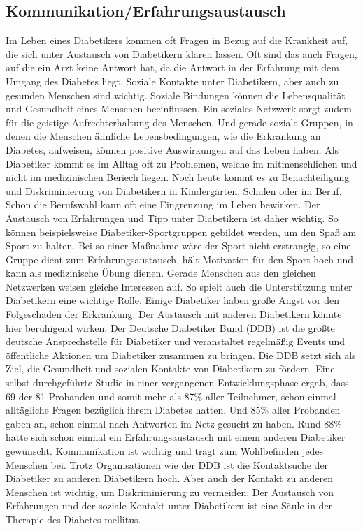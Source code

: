 \documentclass[a4paper,11pt]{article}%
\renewcommand{\\}{\vspace*{0.5\baselineskip} \newline}
\begin{document}
\subsection{Kommunikation/Erfahrungsaustausch}
	Im Leben eines Diabetikers kommen oft Fragen in Bezug auf die Krankheit auf, die sich unter Austausch von Diabetikern klären lassen. Oft sind das auch Fragen, auf die ein Arzt keine Antwort hat, da die Antwort in der Erfahrung mit dem Umgang des Diabetes liegt.\cite{JR}\\
	Soziale Kontakte unter Diabetikern, aber auch zu gesunden Menschen sind wichtig. Soziale Bindungen können die Lebensqualität und Gesundheit eines Menschen beeinflussen. Ein soziales Netzwerk sorgt zudem für die geistige Aufrechterhaltung des Menschen. Und gerade soziale Gruppen, in denen die Menschen ähnliche Lebensbedingungen, wie die Erkrankung an Diabetes, aufweisen, können positive Auswirkungen auf das Leben haben. \newline
	Als Diabetiker kommt es im Alltag oft zu Problemen, welche im mitmenschlichen und nicht im medizinischen Beriech liegen. Noch heute kommt es zu Benachteiligung und Diskriminierung von Diabetikern in Kindergärten, Schulen oder im Beruf. Schon die Berufswahl kann oft eine Eingrenzung im Leben bewirken. Der Austausch von Erfahrungen und Tipp unter Diabetikern ist daher wichtig. So können beispielsweise Diabetiker-Sportgruppen gebildet werden, um den Spaß am Sport zu halten. Bei so einer Maßnahme wäre der Sport nicht erstrangig, so eine Gruppe dient zum Erfahrungsaustausch, hält Motivation für den Sport hoch und kann als medizinische Übung dienen. Gerade Menschen aus den gleichen Netzwerken weisen gleiche Interessen auf. So spielt auch die Unterstützung unter Diabetikern eine wichtige Rolle. Einige Diabetiker haben große Angst vor den Folgeschäden der Erkrankung. Der Austausch mit anderen Diabetikern könnte hier beruhigend wirken.\cite{SG}\newline
	Der Deutsche Diabetiker Bund (DDB) ist die größte deutsche Ansprechstelle für Diabetiker und veranstaltet regelmäßig Events und öffentliche Aktionen um Diabetiker zusammen zu bringen. Die DDB setzt sich als Ziel, die Gesundheit und sozialen Kontakte von Diabetikern zu fördern.\cite{JR}\\
	Eine selbst durchgeführte Studie  in einer vergangenen Entwicklungsphase ergab, dass 69 der 81 Probanden und somit mehr als 87\% aller Teilnehmer, schon einmal alltägliche Fragen bezüglich ihrem Diabetes hatten. Und 85\% aller Probanden gaben an, schon einmal nach Antworten im Netz gesucht zu haben. Rund 88\% hatte sich schon einmal ein Erfahrungsaustausch mit einem anderen Diabetiker gewünscht.\\
	Kommunikation ist wichtig und trägt zum Wohlbefinden jedes Menschen bei. Trotz Organisationen wie der DDB ist die Kontaktsuche der Diabetiker zu anderen Diabetikern hoch. Aber auch der Kontakt zu anderen Menschen ist wichtig, um Diskriminierung zu vermeiden. Der Austausch von Erfahrungen und der soziale Kontakt unter Diabetikern ist eine Säule in der Therapie des Diabetes mellitus.
\newpage
\end{document}
